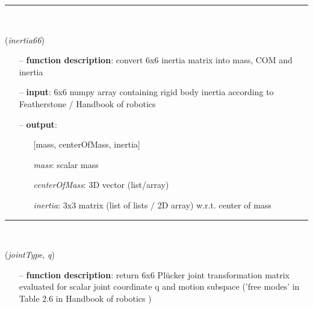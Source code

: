 \begin{itemize}[leftmargin=1.4cm]
\begin{itemize}[leftmargin=1.4cm]
\begin{itemize}[leftmargin=0.5cm]
\begin{itemize}[leftmargin=1.4cm]
\begin{itemize}[leftmargin=1.4cm]
\begin{itemize}[leftmargin=0.5cm]
\begin{itemize}[leftmargin=1.4cm]
\begin{itemize}[leftmargin=0.5cm]
\begin{itemize}[leftmargin=1.4cm]
\begin{itemize}[leftmargin=1.4cm]
\begin{itemize}[leftmargin=1.4cm]
%
\noindent\rule{8cm}{0.75pt}\vspace{1pt} \\ 
\begin{flushleft}
\label{sec:kinematicTree:Inertia66toMassCOMinertia}
({\it inertia66})
\end{flushleft}
\setlength{\itemindent}{0.7cm}
\begin{itemize}[leftmargin=0.7cm]
  \item[--]  {\bf function description}: convert 6x6 inertia matrix into mass, COM and inertia  \item[--]  {\bf input}: 6x6 numpy array containing rigid body inertia according to Featherstone / Handbook of robotics \cite{Siciliano2016}  \item[--]  {\bf output}: \vspace{-6pt}
  \begin{itemize}[leftmargin=1.2cm]
\setlength{\itemindent}{-0.7cm}
    \item[] [mass, centerOfMass, inertia]
    \item[] {\it   mass}: scalar mass
    \item[] {\it   centerOfMass}: 3D vector (list/array)
    \item[] {\it   inertia}: 3x3 matrix (list of lists / 2D array) w.r.t. center of mass
  \end{itemize}
\vspace{12pt}\end{itemize}
%
\noindent\rule{8cm}{0.75pt}\vspace{1pt} \\ 
\begin{flushleft}
\label{sec:kinematicTree:JointTransformMotionSubspace66}
({\it jointType}, {\it q})
\end{flushleft}
\setlength{\itemindent}{0.7cm}
\begin{itemize}[leftmargin=0.7cm]
  \item[--]  {\bf function description}: return 6x6 Pl\"ucker joint transformation matrix evaluated for scalar joint coordinate q and motion subspace ('free modes' in Table 2.6 in Handbook of robotics \cite{Siciliano2016})\vspace{12pt}\end{itemize}

\end{itemize}
\end{itemize}
\end{itemize}
\end{itemize}
\end{itemize}
\end{itemize}
\end{itemize}
\end{itemize}
\end{itemize}
\end{itemize}
\end{itemize}
